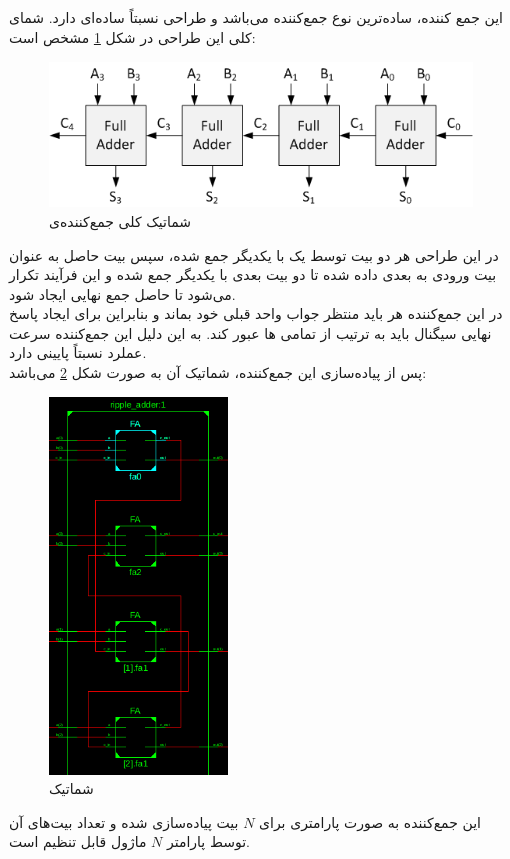 \documentclass{article}
\begin{document}
\subsection{}
این جمع کننده، ساده‌ترین نوع جمع‌کننده می‌باشد و طراحی نسبتاً ساده‌ای دارد. شمای کلی این طراحی در شکل \ref{fig:rip-car-schem} مشخص است:
\begin{figure}[H]
\centering
\includegraphics[width=12cm]{ripple-carry-adder-schematic}
\caption{شماتیک کلی جمع‌کننده‌ی }
\label{fig:rip-car-schem}
\end{figure}
\noindent
در این طراحی هر دو بیت توسط یک  با یکدیگر جمع شده، سپس بیت  حاصل به عنوان بیت  ورودی به  بعدی داده شده تا دو بیت بعدی با یکدیگر جمع شده و این فرآیند تکرار می‌شود تا حاصل جمع نهایی ایجاد شود. \\
در این جمع‌کننده هر  باید منتظر جواب واحد قبلی خود بماند و بنابراین برای ایجاد پاسخ نهایی سیگنال باید به ترتیب از تمامی ها عبور کند. به این دلیل این جمع‌کننده سرعت عملرد نسبتاً پایینی دارد.\\
پس از پیاده‌سازی این جمع‌کننده، شماتیک  آن به صورت شکل \ref{fig:rip-car-rtl} می‌باشد:
\begin{figure}[H]
\centering
\includegraphics[height=10cm]{ripple-carry-adder-rtl}
\caption{شماتیک }
\label{fig:rip-car-rtl}
\end{figure}
\noindent
این جمع‌کننده به صورت پارامتری برای $N$ بیت پیاده‌سازی شده و تعداد بیت‌های آن توسط پارامتر $N$ ماژول قابل تنظیم است.
\pagebreak
\end{document}
